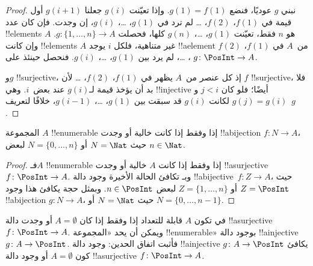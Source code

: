 \documentclass[../../../include/open-logic-section]{subfiles}
\begin{document}
\begin{proof}
نبني $g$ عوديًا، فنضع $g(1) = f(1)$. وإذا تعيّنت $g(i)$
جعلنا $g(i+1)$ أول قيمة في $f(1)$، $f(2)$، \dots{}
لم ترد في $g(1)$، \dots، $g(i)$، إن وجدت.
فإن كان عدد !!{element}s $A$ هو $n$ فقط، تعيّنت
$g(1)$، \dots، $g(n)$ كلها، فحصلت $g\colon \{1, \dots, n\} \to A$.
وإن كانت !!{element}s $A$ غير متناهية، فلكل $i$ يوجد !!a{element}
من~$A$ في $f(1)$، $f(2)$، \dots، لم يرد بين $g(1)$، \dots، $g(i)$.
فنحصل حينئذ على $g\colon \PosInt \to A$.

و$g$ !!{surjective}، إذ كل عنصر من~$A$ يظهر في
$f(1)$، $f(2)$، \dots{} لأن $f$ !!{surjective}، فلا بد أن يؤخذ
قيمة لـ$g(i)$ عند بعض~$i$. وهي !!{injective} أيضًا؛ فلو كان
$j < i$ و$g(j) = g(i)$ لكانت $g(i)$ قد سبقت بين
$g(1)$، \dots، $g(i-1)$، خلافًا لتعريف~$g$.
\end{proof}

\begin{cor}
المجموعة $A$ !!{enumerable} إذا وفقط إذا كانت خالية أو وجدت
!!a{bijection} $f\colon N \to A$، حيث $N = \Nat$ أو
$N = \{0, \dots, n\}$ لبعض $n \in \Nat$.
\end{cor}

\begin{proof}
فـ$A$ !!{enumerable} إذا وفقط إذا كانت $A$ خالية أو وجدت
!!a{surjective} $f\colon \PosInt \to A$. وبـ
تكافئ الحالة الأخيرة وجود دالة !!a{bijective}~$f\colon Z \to A$،
حيث $Z = \PosInt$ أو $Z = \{1, \dots, n\}$ لبعض $n \in \PosInt$.
وبمثل حجة  يكافئ هذا وجود
!!a{bijection} $g\colon N \to A$، حيث $N = \Nat$ أو $N = \{0, \dots, n-1\}$.
\end{proof}

\begin{prob}
في  تكون $A$ قابلة للتعداد
إذا وفقط إذا كان $A = \emptyset$ أو وجدت دالة !!a{surjective}
$f\colon \PosInt \to A$. ويمكن أن يحد «المجموعة !!{enumerable}»
بوجود دالة !!a{injective} $g\colon A \to \PosInt$.
فأثبت اتفاق الحدين: وجود دالة !!a{injective} $g\colon A \to \PosInt$
يكافئ كون $A = \emptyset$ أو وجود دالة !!a{surjective} $f\colon \PosInt \to A$.
\end{prob}
\end{document}

